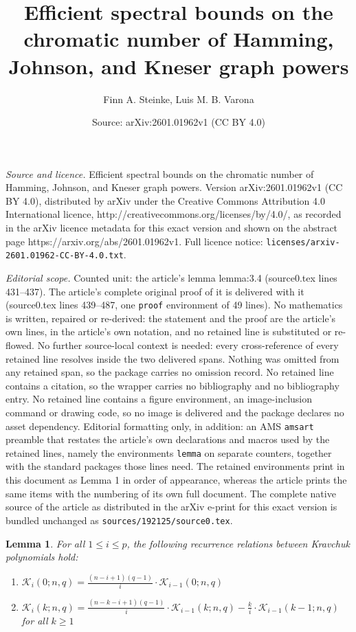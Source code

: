 \documentclass[10pt,a4paper]{amsart}
\title{Efficient spectral bounds on the chromatic number of Hamming, Johnson, and Kneser graph powers}
\author{Finn A. Steinke, Luis M. B. Varona}
\date{Source: arXiv:2601.01962v1 (CC BY 4.0)}
\newtheorem{lemma}{Lemma}
\def\K{\mathcal{K}}
\begin{document}
\maketitle

\noindent\emph{Source and licence.} Efficient spectral bounds on the chromatic number of Hamming, Johnson, and Kneser graph powers. Version arXiv:2601.01962v1 (CC BY 4.0), distributed by arXiv under the Creative Commons Attribution 4.0 International licence, http://creativecommons.org/licenses/by/4.0/, as recorded in the arXiv licence metadata for this exact version and shown on the abstract page https://arxiv.org/abs/2601.01962v1. Full licence notice: \texttt{licenses/arxiv-2601.01962-CC-BY-4.0.txt}.\par\smallskip

\noindent\textit{Editorial scope.} Counted unit: the article's lemma lemma:3.4 (source0.tex lines 431--437). The article's complete original proof of it is delivered with it (source0.tex lines 439--487, one \texttt{proof} environment of 49 lines). No mathematics is written, repaired or re-derived: the statement and the proof are the article's own lines, in the article's own notation, and no retained line is substituted or re-flowed.  No further source-local context is needed: every cross-reference of every retained line resolves inside the two delivered spans.  Nothing was omitted from any retained span, so the package carries no omission record.  No retained line contains a citation, so the wrapper carries no bibliography and no bibliography entry.  No retained line contains a figure environment, an image-inclusion command or drawing code, so no image is delivered and the package declares no asset dependency.  Editorial formatting only, in addition: an AMS \texttt{amsart} preamble that restates the article's own declarations and macros used by the retained lines, namely the environments \texttt{lemma} on separate counters, together with the standard packages those lines need.  The retained environments print in this document as Lemma 1 in order of appearance, whereas the article prints the same items with the numbering of its own full document.  The complete native source of the article as distributed in the arXiv e-print for this exact version is bundled unchanged as \texttt{sources/192125/source0.tex}.
\begin{lemma}\label{lemma:3.4}
    For all $1 \le i \le p$, the following recurrence relations between Kravchuk polynomials hold:
    \begin{enumerate}[label=(\roman*)]
        \item $\displaystyle \K_i(0; n, q) = \frac{(n - i + 1)(q - 1)}{i} \cdot \K_{i - 1}(0; n, q)$
        \item $\displaystyle \K_i(k; n, q) = \frac{(n - k - i + 1)(q - 1)}{i} \cdot \K_{i - 1}(k; n, q) - \frac{k}{i} \cdot \K_{i - 1}(k - 1; n, q)$ for all $k \ge 1$
    \end{enumerate}
\end{lemma}
\end{document}
